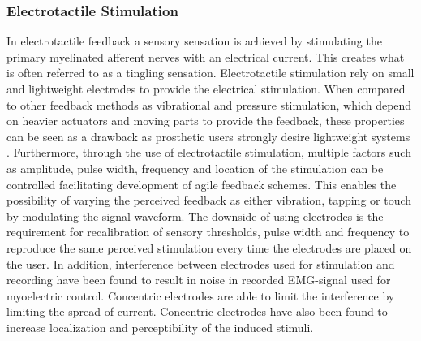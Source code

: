 \subsubsection{Electrotactile Stimulation} \label{E-stim}

In electrotactile feedback a sensory sensation is achieved by stimulating the primary myelinated afferent nerves with an electrical current. This creates what is often referred to as a tingling sensation. Electrotactile stimulation rely on small and lightweight electrodes to provide the electrical stimulation. When compared to other feedback methods as vibrational and pressure stimulation, which depend on heavier actuators and moving parts to provide the feedback, these properties can be seen as a drawback as prosthetic users strongly desire lightweight systems \cite{Stephens-Fripp2018,Benz2016}. Furthermore, through the use of electrotactile stimulation, multiple factors such as amplitude, pulse width, frequency and location of the stimulation can be controlled facilitating development of agile feedback schemes. This enables the possibility of varying the perceived feedback as either vibration, tapping or touch by modulating the signal waveform. The downside of using electrodes is the requirement for recalibration of sensory thresholds, pulse width and frequency to reproduce the same perceived stimulation every time the electrodes are placed on the user. In addition, interference between electrodes used for stimulation and recording have been found to result in noise in recorded EMG-signal used for myoelectric control. Concentric electrodes are able to limit the interference by limiting the spread of current. Concentric electrodes have also been found to increase localization and perceptibility of the induced stimuli. \cite{Schofield2014,Stephens-Fripp2018,Antfolk2018} 







